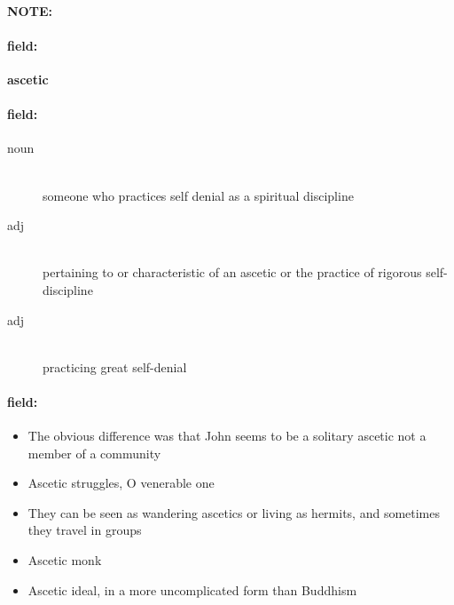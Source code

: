 \documentclass[12pt]{article}
\newenvironment{note}{\paragraph{NOTE:}}{}
\newenvironment{field}{\paragraph{field:}}{}
\begin{document}
\begin{note}
\begin{field}
\textbf{\large ascetic}
\end{field}


\begin{field}
\begin{description}
\item[noun] \hfill \\ 
someone who practices self denial as a spiritual discipline

\item[adj] \hfill \\ 
pertaining to or characteristic of an ascetic or the practice of rigorous self-discipline

\item[adj] \hfill \\ 
practicing great self-denial

\end{description}
\end{field}

\begin{field}
\begin{itemize}
\item The obvious difference was that John seems to be a solitary ascetic not a member of a community
\item Ascetic struggles, O venerable one
\item They can be seen as wandering ascetics or living as hermits, and sometimes they travel in groups
\item Ascetic monk
\item Ascetic ideal, in a more uncomplicated form than Buddhism
\end{itemize}
\end{field}
\end{note}
\end{document}
